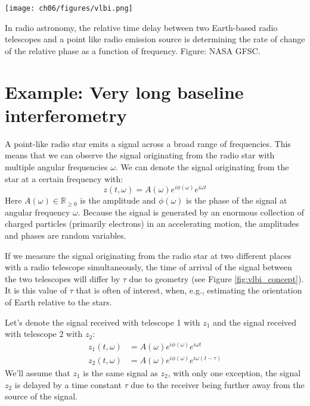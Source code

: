 \begin{marginfigure}
  \begin{center}
    \texttt{[image: ch06/figures/vlbi.png]}
  \end{center}
  \caption{In radio astronomy, the relative time delay between two Earth-based radio telescopes and a point like radio emission source is determining the rate of change of the relative phase as a function of frequency. Figure: NASA GFSC.}
  \label{fig:vlbi_concept}
\end{marginfigure}

\section{Example: Very long baseline interferometry}
A point-like radio star emits a signal across a broad range of frequencies. This means that we can
observe the signal originating from the radio star with multiple angular frequencies $\omega$.
We can denote the signal originating from the star at a certain frequency with:
\begin{equation}
  z(t,\omega) = A(\omega) e^{i\phi(\omega)} e^{i\omega t}
\end{equation}
Here $A(\omega) \in \mathbb{R}_{\ge 0}$ is the amplitude and $\phi(\omega)$ is the phase of the
signal at angular frequency $\omega$. Because the signal is generated by an enormous collection
of charged particles (primarily electrons) in an accelerating motion,
the amplitudes and phases are random variables.

If we measure the signal originating from the radio star at two different places with a
radio telescope simultaneously, the time of arrival of the signal between the two telescopes
will differ by $\tau$ due to geometry (see Figure \ref{fig:vlbi_concept}).
It is this value of $\tau$ that is often of interest, when, e.g., estimating
the orientation of Earth relative to the stars.

Let's denote the signal received with telescope 1 with $z_1$ and the signal received with telescope 2 with $z_2$:
\begin{align}
  z_1(t,\omega) & = A(\omega) e^{i\phi(\omega)} e^{i\omega t}        \\
  z_2(t,\omega) & = A(\omega) e^{i\phi(\omega)} e^{i\omega (t-\tau)}
\end{align}
We'll assume that $z_1$ is the same signal as $z_2$, with only one exception, the signal $z_2$
is delayed by a time constant $\tau$ due to the receiver being further away
from the source of the signal.

